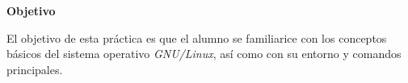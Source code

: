 \documentclass[a4paper,11pt]{exam}
\begin{document}
\maketitle

\textbf{Objetivo}

El objetivo de esta práctica es que el alumno se familiarice con los conceptos básicos
del sistema operativo \textit{GNU/Linux}, así como con su entorno y comandos principales.


\end{document}

